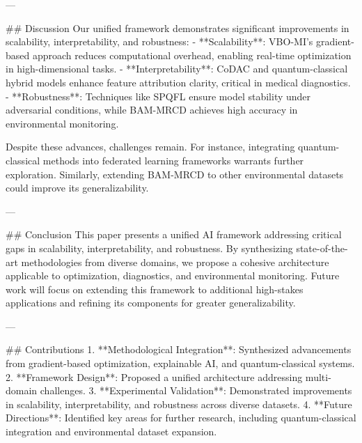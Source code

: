---

## Discussion
Our unified framework demonstrates significant improvements in scalability, interpretability, and robustness:
- **Scalability**: VBO-MI's gradient-based approach reduces computational overhead, enabling real-time optimization in high-dimensional tasks.
- **Interpretability**: CoDAC and quantum-classical hybrid models enhance feature attribution clarity, critical in medical diagnostics.
- **Robustness**: Techniques like SPQFL ensure model stability under adversarial conditions, while BAM-MRCD achieves high accuracy in environmental monitoring.

Despite these advances, challenges remain. For instance, integrating quantum-classical methods into federated learning frameworks warrants further exploration. Similarly, extending BAM-MRCD to other environmental datasets could improve its generalizability.

---

## Conclusion
This paper presents a unified AI framework addressing critical gaps in scalability, interpretability, and robustness. By synthesizing state-of-the-art methodologies from diverse domains, we propose a cohesive architecture applicable to optimization, diagnostics, and environmental monitoring. Future work will focus on extending this framework to additional high-stakes applications and refining its components for greater generalizability.

---

## Contributions
1. **Methodological Integration**: Synthesized advancements from gradient-based optimization, explainable AI, and quantum-classical systems.
2. **Framework Design**: Proposed a unified architecture addressing multi-domain challenges.
3. **Experimental Validation**: Demonstrated improvements in scalability, interpretability, and robustness across diverse datasets.
4. **Future Directions**: Identified key areas for further research, including quantum-classical integration and environmental dataset expansion.

